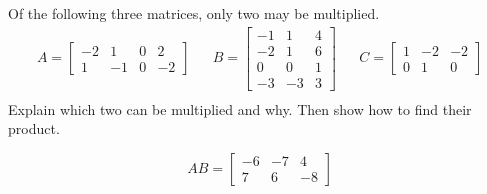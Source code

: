 
\begin{exerciseStatement}


Of the following three matrices, only two may be multiplied. 
\begin{align*} A= \left[\begin{array}{cccc}
-2 & 1 & 0 & 2 \\
1 & -1 & 0 & -2
\end{array}\right]  & & B= \left[\begin{array}{ccc}
-1 & 1 & 4 \\
-2 & 1 & 6 \\
0 & 0 & 1 \\
-3 & -3 & 3
\end{array}\right]  & & C= \left[\begin{array}{ccc}
1 & -2 & -2 \\
0 & 1 & 0
\end{array}\right]  \\ \end{align*}
             Explain which two can be multiplied and why. Then show how to find their product.


\end{exerciseStatement}
    
\begin{exerciseAnswer} 
\[AB= \left[\begin{array}{ccc}
-6 & -7 & 4 \\
7 & 6 & -8
\end{array}\right] \]
\end{exerciseAnswer}
    
